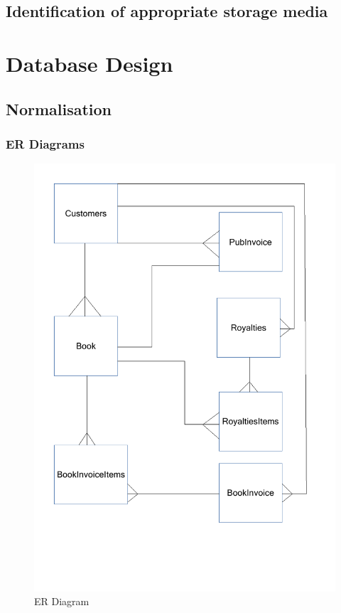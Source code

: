 \subsection{Identification of appropriate storage media}


\newpage

\section{Database Design}

\subsection{Normalisation}
 
\subsubsection{ER Diagrams}


\begin{figure}[H]
    \caption{ER Diagram} \label{ER_Diagram.pdf}
    \includegraphics[width=\textwidth]{./Design/ER_Diagram.pdf}
\end{figure}



